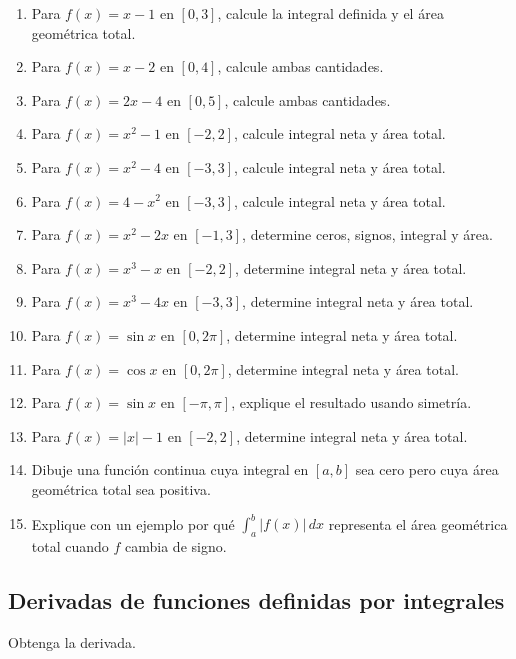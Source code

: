 \documentclass[12pt]{article}
\begin{document}
\begin{enumerate}[resume]
\item Para $f(x)=x-1$ en $[0,3]$, calcule la integral definida y el área geométrica total.
\item Para $f(x)=x-2$ en $[0,4]$, calcule ambas cantidades.
\item Para $f(x)=2x-4$ en $[0,5]$, calcule ambas cantidades.
\item Para $f(x)=x^2-1$ en $[-2,2]$, calcule integral neta y área total.
\item Para $f(x)=x^2-4$ en $[-3,3]$, calcule integral neta y área total.
\item Para $f(x)=4-x^2$ en $[-3,3]$, calcule integral neta y área total.
\item Para $f(x)=x^2-2x$ en $[-1,3]$, determine ceros, signos, integral y área.
\item Para $f(x)=x^3-x$ en $[-2,2]$, determine integral neta y área total.
\item Para $f(x)=x^3-4x$ en $[-3,3]$, determine integral neta y área total.
\item Para $f(x)=\sin x$ en $[0,2\pi]$, determine integral neta y área total.
\item Para $f(x)=\cos x$ en $[0,2\pi]$, determine integral neta y área total.
\item Para $f(x)=\sin x$ en $[-\pi,\pi]$, explique el resultado usando simetría.
\item Para $f(x)=|x|-1$ en $[-2,2]$, determine integral neta y área total.
\item Dibuje una función continua cuya integral en $[a,b]$ sea cero pero cuya área geométrica total sea positiva.
\item Explique con un ejemplo por qué $\int_a^b|f(x)|\,dx$ representa el área geométrica total cuando $f$ cambia de signo.
\end{enumerate}



\subsection{Derivadas de funciones definidas por integrales}
Obtenga la derivada.
\end{document}
